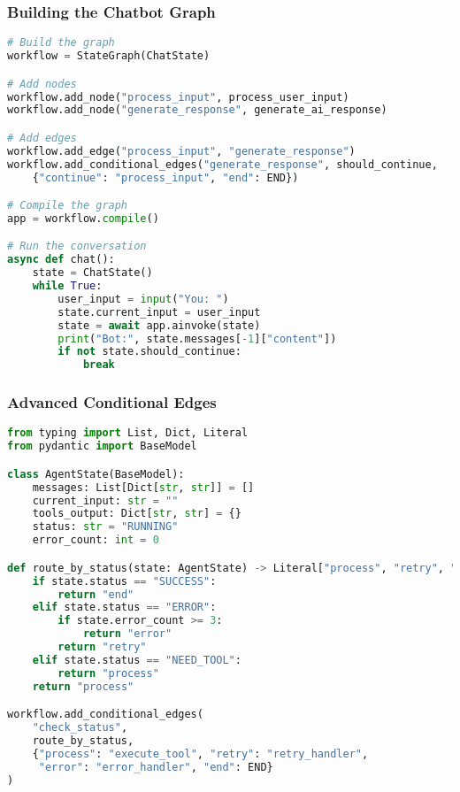 \begin{frame}[fragile]\frametitle{Building the Chatbot Graph}
      \begin{lstlisting}[language=Python, basicstyle=\tiny]
# Build the graph
workflow = StateGraph(ChatState)

# Add nodes
workflow.add_node("process_input", process_user_input)
workflow.add_node("generate_response", generate_ai_response)

# Add edges
workflow.add_edge("process_input", "generate_response")
workflow.add_conditional_edges("generate_response", should_continue, 
    {"continue": "process_input", "end": END})

# Compile the graph
app = workflow.compile()

# Run the conversation
async def chat():
    state = ChatState()
    while True:
        user_input = input("You: ")
        state.current_input = user_input
        state = await app.ainvoke(state)
        print("Bot:", state.messages[-1]["content"])
        if not state.should_continue:
            break
      \end{lstlisting}
\end{frame}

\begin{frame}[fragile]\frametitle{Advanced Conditional Edges}
      \begin{lstlisting}[language=Python, basicstyle=\tiny]
from typing import List, Dict, Literal
from pydantic import BaseModel

class AgentState(BaseModel):
    messages: List[Dict[str, str]] = []
    current_input: str = ""
    tools_output: Dict[str, str] = {}
    status: str = "RUNNING"
    error_count: int = 0

def route_by_status(state: AgentState) -> Literal["process", "retry", "error", "end"]:
    if state.status == "SUCCESS":
        return "end"
    elif state.status == "ERROR":
        if state.error_count >= 3:
            return "error"
        return "retry"
    elif state.status == "NEED_TOOL":
        return "process"
    return "process"

workflow.add_conditional_edges(
    "check_status",
    route_by_status,
    {"process": "execute_tool", "retry": "retry_handler", 
     "error": "error_handler", "end": END}
)
      \end{lstlisting}
\end{frame}

